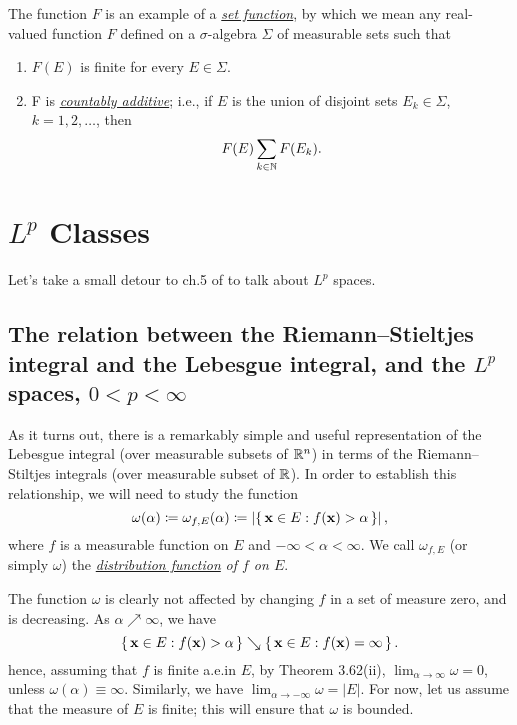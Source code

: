 The function $F$ is an example of a
\href{https://en.wikipedia.org/wiki/Set_function}{\emph{set function}}, by
which we mean any real-valued function $F$ defined on a $\sigma$-algebra
$\Sigma$ of measurable sets such that
\begin{enumerate}[label=(\roman*),noitemsep]
\item $F(E)$ is finite for every $E\in\Sigma$.
\item F is
  \href{https://en.wikipedia.org/wiki/Measure_(mathematics)#Properties}{\emph{countably
      additive}}; i.e., if $E$ is the union of disjoint sets
  $E_k\in\Sigma$, $k=1,2,\dotsc$, then
  \begin{equation}
    \label{eq:3:countably-additive-set-function}
    F(E)\sum_{k\in\mathbb{N}} F(E_k).
  \end{equation}
\end{enumerate}

\section{$L^p$ Classes}
Let's take a small detour to ch.\@ 5 of
\cite{wheeden-zygmund:measure-and-integral} to talk about $L^p$ spaces.
\subsection{The relation between the Riemann--Stieltjes integral and the
  Lebesgue integral, and the $L^p$ spaces, $0<p<\infty$}
As it turns out, there is a remarkably simple and useful representation of
the Lebesgue integral (over measurable subsets of $\mathbb{R}^n$) in terms of the
Riemann--Stiltjes integrals (over measurable subset of $\mathbb{R}$). In order to
establish this relationship, we will need to study the function
\begin{equation}
  \label{eq:eq:3:dist-function}
\omega(\alpha)\coloneqq\omega_{f,E}(\alpha)\coloneqq
\left|\left\{\,\mathbf{x}\in E:f(\mathbf{x})>\alpha\,\right\}\right|,
\end{equation}
where $f$ is a measurable function on $E$ and $-\infty<\alpha<\infty$. We
call $\omega_{f,E}$ (or simply $\omega$) the
\href{https://en.wikipedia.org/wiki/Probability_density_function#Formal_definition}{\emph{distribution
    function}} \emph{of $f$ on $E$}.

The function $\omega$ is clearly not affected by changing $f$ in a set of
measure zero, and is decreasing. As $\alpha\nearrow\infty$, we have
\[
\left\{\,\mathbf{x}\in E:f(\mathbf{x})>\alpha\,\right\}\searrow
\left\{\,\mathbf{x}\in E:f(\mathbf{x})=\infty\,\right\}.
\]
hence, assuming that $f$ is finite a.e.\@ in $E$, by Theorem 3.62(ii),
$\lim_{\alpha\to\infty}\omega=0$, unless
$\omega(\alpha)\equiv\infty$. Similarly, we have
$\lim_{\alpha\to-\infty}\omega=|E|$. For now, let us assume that the
measure of $E$ is finite; this will ensure that $\omega$ is bounded.

